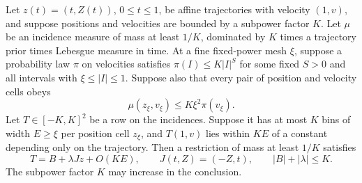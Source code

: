 \begin{lemma}\label{a06:row-fit}
Let \(z(t)=(t,Z(t))\), \(0\le t\le1\), be affine trajectories
with velocity \((1,v)\), and suppose positions and velocities are
bounded by a subpower factor \(K\).  Let \(\mu\) be an incidence
measure of mass at least \(1/K\), dominated by \(K\) times a
trajectory prior times Lebesgue measure in time.  At a fine fixed-power
mesh \(\xi\), suppose a probability law \(\pi\) on velocities
satisfies \(\pi(I)\le K|I|^S\) for some fixed \(S>0\) and all
intervals with \(\xi\le|I|\le1\).  Suppose also that every pair
of position and velocity cells obeys
\[
 \mu(z_\xi,v_\xi)\le K\xi^2\pi(v_\xi).
\]
Let \(T\in[-K,K]^2\) be a row on the incidences.  Suppose it has
at most \(K\) bins of width \(E\ge\xi\) per position cell
\(z_\xi\), and \(T(1,v)\) lies within \(KE\) of a constant
depending only on the trajectory.  Then a restriction of mass at
least \(1/K\) satisfies
\[
 T=B+\lambda Jz+O(KE),\qquad
 J(t,Z)=(-Z,t),\qquad |B|+|\lambda|\le K.
\]
The subpower factor \(K\) may increase in the conclusion.
\end{lemma}
